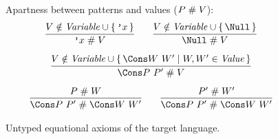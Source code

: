 \begin{figure}

Apartness between patterns and values ($P \mathrel{\#} V$):
\begin{gather*}
  \infer
  {\q{x} \apart V}
  {V \notin \mathit{Variable} \cup \set{\q{x}}}
  \qquad
  \infer
  {\Null \apart V}
  {V \notin \mathit{Variable} \cup \set{\Null}}
  \\[1ex]
  \infer
  {\Cons P ~ P' \apart V}
  {V \notin \mathit{Variable} \cup \set{\Cons W ~ W' \mid W, W' \in \mathit{Value}}}
  \\[1ex]
  \infer
  {\Cons P ~ P' \apart \Cons W ~ W'}
  {P \apart W}
  \qquad
  \infer
  {\Cons P ~ P' \apart \Cons W ~ W'}
  {P' \apart W'}
\end{gather*}

\caption{Untyped equational axioms of the target language.}
\label{fig:target-equality}
\end{figure}


